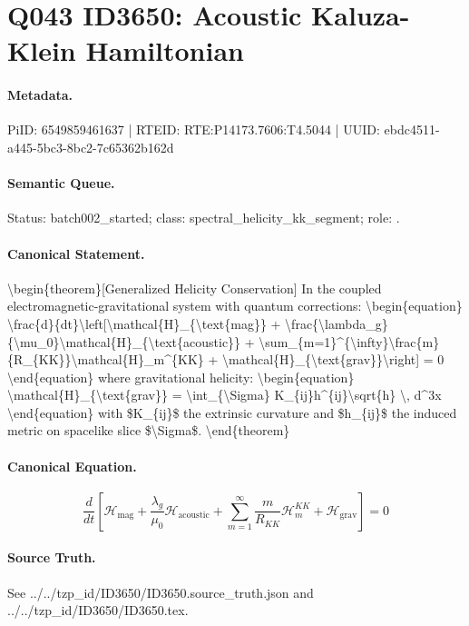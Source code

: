 \section*{Q043 ID3650: Acoustic Kaluza-Klein Hamiltonian}
\paragraph{Metadata.}
PiID: 6549859461637 | RTEID: RTE:P14173.7606:T4.5044 | UUID: ebdc4511-a445-5bc3-8bc2-7c65362b162d

\paragraph{Semantic Queue.}
Status: batch002\_started; class: spectral\_helicity\_kk\_segment; role: .

\paragraph{Canonical Statement.}
\textbackslash{}begin\{theorem\}[Generalized Helicity Conservation] In the coupled electromagnetic-gravitational system with quantum corrections: \textbackslash{}begin\{equation\} \textbackslash{}frac\{d\}\{dt\}\textbackslash{}left[\textbackslash{}mathcal\{H\}\_\{\textbackslash{}text\{mag\}\} + \textbackslash{}frac\{\textbackslash{}lambda\_g\}\{\textbackslash{}mu\_0\}\textbackslash{}mathcal\{H\}\_\{\textbackslash{}text\{acoustic\}\} + \textbackslash{}sum\_\{m=1\}\textasciicircum{}\{\textbackslash{}infty\}\textbackslash{}frac\{m\}\{R\_\{KK\}\}\textbackslash{}mathcal\{H\}\_m\textasciicircum{}\{KK\} + \textbackslash{}mathcal\{H\}\_\{\textbackslash{}text\{grav\}\}\textbackslash{}right] = 0 \textbackslash{}end\{equation\} where gravitational helicity: \textbackslash{}begin\{equation\} \textbackslash{}mathcal\{H\}\_\{\textbackslash{}text\{grav\}\} = \textbackslash{}int\_\{\textbackslash{}Sigma\} K\_\{ij\}h\textasciicircum{}\{ij\}\textbackslash{}sqrt\{h\} \textbackslash{}, d\textasciicircum{}3x \textbackslash{}end\{equation\} with \$K\_\{ij\}\$ the extrinsic curvature and \$h\_\{ij\}\$ the induced metric on spacelike slice \$\textbackslash{}Sigma\$. \textbackslash{}end\{theorem\}

\paragraph{Canonical Equation.}
\[
\begin{equation} \frac{d}{dt}\left[\mathcal{H}_{\text{mag}} + \frac{\lambda_g}{\mu_0}\mathcal{H}_{\text{acoustic}} + \sum_{m=1}^{\infty}\frac{m}{R_{KK}}\mathcal{H}_m^{KK} + \mathcal{H}_{\text{grav}}\right] = 0 \end{equation}
\]

\paragraph{Source Truth.}
See ../../tzp\_id/ID3650/ID3650.source\_truth.json and ../../tzp\_id/ID3650/ID3650.tex.
